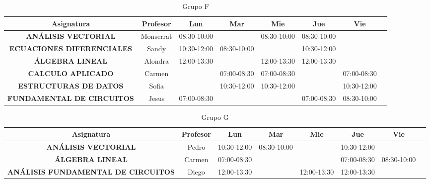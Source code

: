 \documentclass[10pt,letterpaper,twoside,openright]{article}
\begin{document}
	\begin{table}[h!]
		\centering
		\begin{adjustbox}{max width=\textwidth}
		\begin{tabular}{c||ccccccc}
		\textbf{Asignatura}                        & \textbf{Profesor} & \textbf{Lun} & \textbf{Mar} & \textbf{Mie} & \textbf{Jue} & \textbf{Vie} \\ \hline \hline
		\textbf{ANÁLISIS VECTORIAL}                & Monserrat & 08:30-10:00 &             & 08:30-10:00 & 08:30-10:00 &             \\
		\textbf{ECUACIONES DIFERENCIALES}          & Sandy     & 10:30-12:00 & 08:30-10:00 &             & 10:30-12:00 &             \\
		\textbf{ÁLGEBRA LINEAL}                    & Alondra   & 12:00-13:30 &             & 12:00-13:30 & 12:00-13:30 &             \\
		\textbf{CALCULO APLICADO}                  & Carmen    &             & 07:00-08:30 & 07:00-08:30 &             & 07:00-08:30 \\
		\textbf{ESTRUCTURAS DE DATOS}              & Sofia     &             & 10:30-12:00 & 10:30-12:00 &             & 10:30-12:00 \\
		\textbf{FUNDAMENTAL DE CIRCUITOS} & Jesus     & 07:00-08:30 &             &             & 07:00-08:30 & 08:30-10:00
		\end{tabular}
		\end{adjustbox}
		\caption{Grupo F}
		\label{tab:grupo_f}
	\end{table}

	\begin{table}[h!]
		\centering
		\begin{adjustbox}{max width=\textwidth}
		\begin{tabular}{c||ccccccc}
		\textbf{Asignatura}                        & \textbf{Profesor} & \textbf{Lun} & \textbf{Mar} & \textbf{Mie} & \textbf{Jue} & \textbf{Vie} \\ \hline \hline
		\textbf{ANÁLISIS VECTORIAL}                & Pedro    & 10:30-12:00 & 08:30-10:00 &             & 10:30-12:00 &             \\
		\textbf{ÁLGEBRA LINEAL}                    & Carmen   & 07:00-08:30 &             &             & 07:00-08:30 & 08:30-10:00 \\
		\textbf{ANÁLISIS FUNDAMENTAL DE CIRCUITOS} & Diego    & 12:00-13:30 &             & 12:00-13:30 & 12:00-13:30 &            
		\end{tabular}
		\end{adjustbox}
		\caption{Grupo G}
		\label{tab:grupo_g}
	\end{table}
\end{document}
